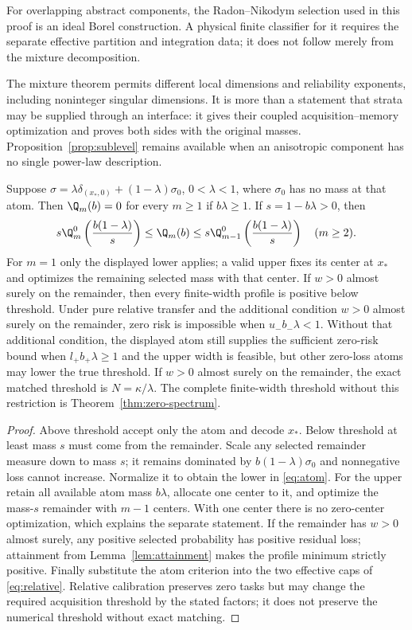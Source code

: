 For overlapping abstract components, the Radon--Nikodym selection used in this proof is an ideal Borel construction. A physical finite classifier for it requires the separate effective partition and integration data; it does not follow merely from the mixture decomposition.

The mixture theorem permits different local dimensions and reliability exponents, including noninteger singular dimensions. It is more than a statement that strata may be supplied through an interface: it gives their coupled acquisition--memory optimization and proves both sides with the original masses. Proposition~\ref{prop:sublevel} remains available when an anisotropic component has no single power-law description.

\begin{proposition}\label{prop:atom}
Suppose $\sigma=\lambda\delta_{(x_*,0)}+(1-\lambda)\sigma_0$, $0<\lambda<1$, where $\sigma_0$ has no mass at that atom. Then $\Q_m(b)=0$ for every $m\ge1$ if $b\lambda\ge1$. If $s=1-b\lambda>0$, then
\begin{equation}\label{eq:atom}
 s\Q_m^0\left(\frac{b(1-\lambda)}s\right)
 \le\Q_m(b)\le
 s\Q_{m-1}^0\left(\frac{b(1-\lambda)}s\right)\quad(m\ge2).
\end{equation}
For $m=1$ only the displayed lower applies; a valid upper fixes its center at $x_*$ and optimizes the remaining selected mass with that center. If $w>0$ almost surely on the remainder, then every finite-width profile is positive below threshold. Under pure relative transfer and the additional condition $w>0$ almost surely on the remainder, zero risk is impossible when $u_-b_-\lambda<1$. Without that additional condition, the displayed atom still supplies the sufficient zero-risk bound when $l_+b_+\lambda\ge1$ and the upper width is feasible, but other zero-loss atoms may lower the true threshold. If $w>0$ almost surely on the remainder, the exact matched threshold is $N=\kappa/\lambda$. The complete finite-width threshold without this restriction is Theorem~\ref{thm:zero-spectrum}.
\end{proposition}
\begin{proof}
Above threshold accept only the atom and decode $x_*$. Below threshold at least mass $s$ must come from the remainder. Scale any selected remainder measure down to mass $s$; it remains dominated by $b(1-\lambda)\sigma_0$ and nonnegative loss cannot increase. Normalize it to obtain the lower in \eqref{eq:atom}. For the upper retain all available atom mass $b\lambda$, allocate one center to it, and optimize the mass-$s$ remainder with $m-1$ centers. With one center there is no zero-center optimization, which explains the separate statement. If the remainder has $w>0$ almost surely, any positive selected probability has positive residual loss; attainment from Lemma~\ref{lem:attainment} makes the profile minimum strictly positive. Finally substitute the atom criterion into the two effective caps of \eqref{eq:relative}. Relative calibration preserves zero tasks but may change the required acquisition threshold by the stated factors; it does not preserve the numerical threshold without exact matching.
\end{proof}

